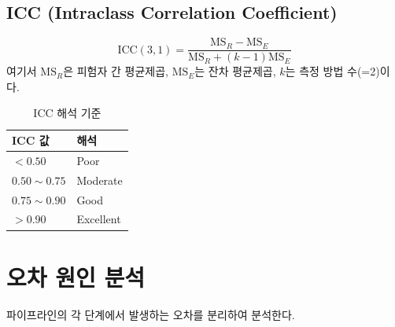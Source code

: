 \documentclass[11pt, a4paper]{report}
\begin{document}
\subsection{ICC (Intraclass Correlation Coefficient)}

\begin{equation}
  \text{ICC}(3,1) = \frac{\text{MS}_R - \text{MS}_E}{\text{MS}_R + (k-1)\text{MS}_E}
\end{equation}
여기서 $\text{MS}_R$은 피험자 간 평균제곱, $\text{MS}_E$는 잔차 평균제곱, $k$는 측정 방법 수(=2)이다.

\begin{table}[H]
\centering
\caption{ICC 해석 기준 \cite{koo2016}}
\begin{tabular}{ll}
\toprule
\textbf{ICC 값} & \textbf{해석} \\
\midrule
$< 0.50$ & Poor \\
$0.50 \sim 0.75$ & Moderate \\
$0.75 \sim 0.90$ & Good \\
$> 0.90$ & Excellent \\
\bottomrule
\end{tabular}
\end{table}

\section{오차 원인 분석}

파이프라인의 각 단계에서 발생하는 오차를 분리하여 분석한다.
\end{document}
